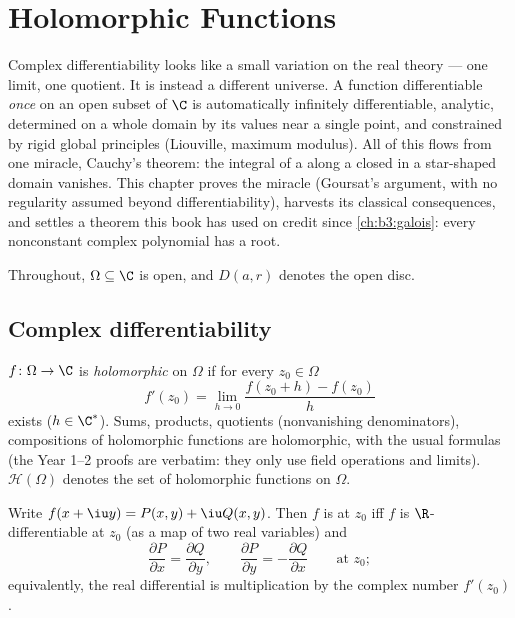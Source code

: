 \chapter{Holomorphic Functions}\label{ch:b3:holomorphic}

Complex differentiability looks like a small variation on the
real theory --- one limit, one quotient. It is instead a
different universe. A function differentiable \emph{once} on an
open subset of $\C$ is automatically infinitely differentiable,
analytic, determined on a whole domain by its values near a
single point, and constrained by rigid global principles
(Liouville, maximum modulus). All of this flows from one
miracle, Cauchy's theorem: the integral of a  along a closed  in a star-shaped domain vanishes.
This chapter proves the miracle (Goursat's argument, with no
regularity assumed beyond differentiability), harvests its
classical consequences, and settles a theorem this book has
used on credit since \cref{ch:b3:galois}: every nonconstant
complex polynomial has a root.

Throughout, $\Omega \subseteq \C$ is open, and $D(a, r)$
denotes the open disc.

\section{Complex differentiability}

\begin{definition}\label{def:b3:holomorphic:holo}
$f \colon \Omega \to \C$ is \emph{holomorphic} on $\Omega$ if for every $z_0 \in \Omega$
\[
f'(z_0) = \lim_{h\to0}\frac{f(z_0 + h) - f(z_0)}{h}
\]
exists ($h \in \C^*$). Sums, products, quotients (nonvanishing
denominators), compositions of holomorphic functions are
holomorphic, with the usual formulas (the Year 1--2 proofs are
verbatim: they only use field operations and limits).
$\mathcal H(\Omega)$ denotes the set of holomorphic functions
on $\Omega$.
\end{definition}

\begin{proposition}
\label{prop:b3:holomorphic:cauchyriemann}
Write $f(x + \iu y) = P(x,y) + \iu Q(x,y)$. Then $f$ is
 at $z_0$ iff $f$ is $\R$-differentiable at $z_0$
(as a map of two real variables) and
\[
\frac{\partial P}{\partial x} = \frac{\partial Q}{\partial y},
\qquad
\frac{\partial P}{\partial y} = -\frac{\partial Q}{\partial x}
\qquad \text{at } z_0 ;
\]
equivalently, the real differential is multiplication by the
complex number $f'(z_0)$.
\end{proposition}

